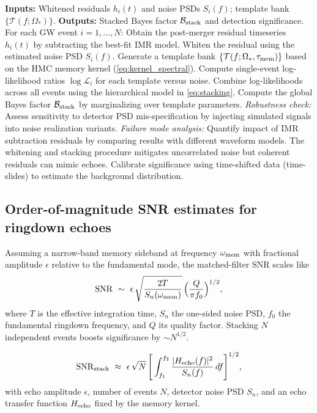 \documentclass[a4paper,11pt]{article}
\newcommand{\HMC}{\textsc{HMC}\xspace}
\theoremstyle{plain}
\theoremstyle{definition}
\theoremstyle{remark}
\begin{document}
\begin{algorithm}[htbp]
\caption{Comb matched-filter search for \HMC{} echoes.}
\label{alg:combfilter}
\begin{algorithmic}[1]
\State \textbf{Inputs:} Whitened residuals $h_i(t)$ and noise PSDs $S_i(f)$; template bank $\{\mathcal{T}(f;\Omega_\ast)\}$.
\State \textbf{Outputs:} Stacked Bayes factor $\mathcal{B}_{\rm stack}$ and detection significance.
\State For each GW event $i=1,\dots,N$:
\State \quad Obtain the post-merger residual timeseries $h_i(t)$ by subtracting the best-fit IMR model.
\State \quad Whiten the residual using the estimated noise PSD $S_i(f)$.
\State \quad Generate a template bank $\{\mathcal{T}(f;\Omega_\ast, \tau_{\rm mem})\}$ based on the \HMC{} memory kernel (\eqref{eq:kernel_spectral}).
\State \quad Compute single-event log-likelihood ratios $\log\mathcal{L}_i$ for each template versus noise.
\State Combine log-likelihoods across all events using the hierarchical model in \eqref{eq:stacking}.
\State Compute the global Bayes factor $\mathcal{B}_{\rm stack}$ by marginalizing over template parameters.
\State \quad \textit{Robustness check:} Assess sensitivity to detector PSD mis-specification by injecting simulated signals into noise realization variants.
\State \quad \textit{Failure mode analysis:} Quantify impact of IMR subtraction residuals by comparing results with different waveform models. The whitening and stacking procedure mitigates uncorrelated noise but coherent residuals can mimic echoes.
\State Calibrate significance using time-shifted data (time-slides) to estimate the background distribution.
\end{algorithmic}
\end{algorithm}

\subsection{Order-of-magnitude SNR estimates for ringdown echoes}
\label{sec:snr_estimates}
Assuming a narrow-band memory sideband at frequency $\omega_{\rm mem}$ with fractional amplitude $\epsilon$ relative to the fundamental mode,
the matched-filter SNR scales like
\[
{\rm SNR}\ \sim\ \epsilon\,\sqrt{\frac{2 T}{S_n(\omega_{\rm mem})}}\,\Big(\frac{Q}{\pi f_0}\Big)^{1/2},
\]
where $T$ is the effective integration time, $S_n$ the one-sided noise PSD, $f_0$ the fundamental ringdown frequency, and $Q$ its quality factor.
Stacking $N$ independent events boosts significance by $\sim N^{1/2}$.

\begin{equation}
\label{eq:snr-stack}
\mathrm{SNR}_{\rm stack}\ \approx\ \epsilon\,\sqrt{N}\,\Bigg[\int_{f_1}^{f_2}\frac{|H_{\rm echo}(f)|^2}{S_n(f)}\,df\Bigg]^{1/2},
\end{equation}
with echo amplitude \(\epsilon\), number of events \(N\), detector noise PSD \(S_n\), and an echo transfer function \(H_{\rm echo}\) fixed by the memory kernel.
\end{document}

